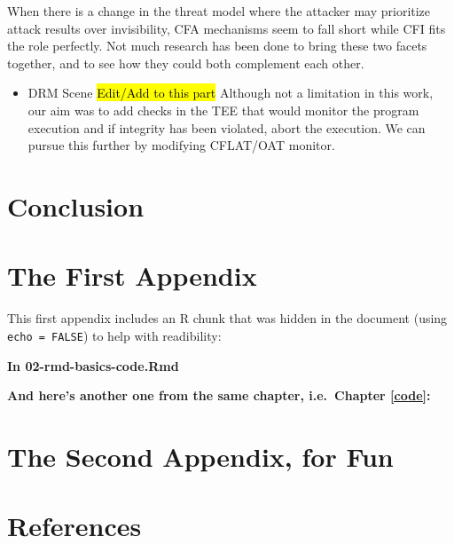 \documentclass[a4paper, nobind]{templates/ociamthesis}
\providecommand{\tightlist}{%
  \setlength{\itemsep}{0pt}\setlength{\parskip}{0pt}}
\begin{document}
When there is a change in the threat model where the attacker may prioritize
attack results over invisibility, CFA mechanisms seem to fall short while CFI fits the
role perfectly. Not much research has been done to bring these two facets together,
and to see how they could both complement each other.

\begin{itemize}
\tightlist
\item
  DRM Scene
  \hl{Edit/Add to this part}
  Although not a limitation in this work, our aim was to add checks in the TEE
  that would monitor the program execution and if integrity has been violated,
  abort the execution. We can pursue this further by modifying CFLAT/OAT monitor.
\end{itemize}

\chapter*{Conclusion}\label{conclusion}

\startappendices

\chapter{The First Appendix}\label{the-first-appendix}

This first appendix includes an R chunk that was hidden in the document (using \texttt{echo\ =\ FALSE}) to help with readibility:

\textbf{In 02-rmd-basics-code.Rmd}

\textbf{And here's another one from the same chapter, i.e.~Chapter \ref{code}:}

\chapter{The Second Appendix, for Fun}\label{the-second-appendix-for-fun}

\chapter*{References}\label{references}

\end{document}
